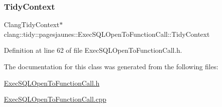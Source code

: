 \subsubsection{\texorpdfstring{Tidy\+Context}{TidyContext}}
{\footnotesize\ttfamily Clang\+Tidy\+Context$\ast$ clang\+::tidy\+::pagesjaunes\+::\+Exec\+S\+Q\+L\+Open\+To\+Function\+Call\+::\+Tidy\+Context}



Definition at line 62 of file Exec\+S\+Q\+L\+Open\+To\+Function\+Call.\+h.



The documentation for this class was generated from the following files\+:\begin{DoxyCompactItemize}
\item 
\hyperlink{_exec_s_q_l_open_to_function_call_8h}{Exec\+S\+Q\+L\+Open\+To\+Function\+Call.\+h}\item 
\hyperlink{_exec_s_q_l_open_to_function_call_8cpp}{Exec\+S\+Q\+L\+Open\+To\+Function\+Call.\+cpp}\end{DoxyCompactItemize}
